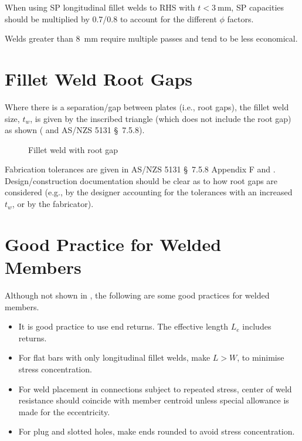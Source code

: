 When using SP longitudinal fillet welds to RHS with $t<\SI{3}{\mm}$, SP capacities should be multiplied by \num{0.7}/\num{0.8} to account for the different $\phi$ factors.

Welds greater than \SI{8}{\mm} require multiple passes and tend to be less economical.
\section{Fillet Weld Root Gaps}
Where there is a separation/gap between plates (i.e., root gaps), the fillet weld size, $t_w$, is given by the inscribed triangle (which does not include the root gap) as shown ( and AS/NZS 5131 \S~7.5.8).
\begin{figure}[H]
\centering
\caption{Fillet weld with root gap}
\end{figure}

Fabrication tolerances are given in AS/NZS 5131 \S~7.5.8 Appendix F and .
Design/construction documentation should be clear as to how root gaps are considered (e.g., by the designer accounting for the tolerances with an increased $t_w$, or by the fabricator).
\section{Good Practice for Welded Members}
Although not shown in \NZSSTEEL{}, the following are some good practices for welded members.
\begin{itemize}
\item It is good practice to use end returns.
The effective length $L_e$ includes returns.
\begin{figure}[H]
\centering
\end{figure}
\item For flat bars with only longitudinal fillet welds, make $L>W$, to minimise stress concentration.
\begin{figure}[H]
\centering
\end{figure}
\item For weld placement in connections subject to repeated stress, center of weld resistance should coincide with member centroid unless special allowance is made for the eccentricity.
\begin{figure}[H]
\centering
\end{figure}
\item For plug and slotted holes, make ends rounded to avoid stress concentration.
\begin{figure}[H]
\centering
\end{figure}
\end{itemize}
